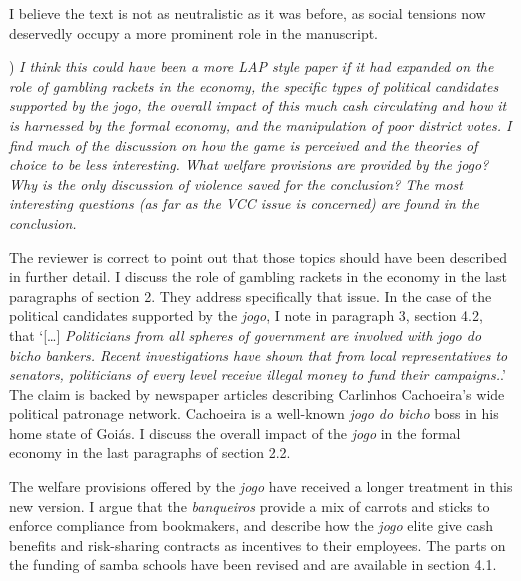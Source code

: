 \documentclass[a4paper,12pt]{article}
\begin{document}
I believe the text is not as neutralistic as it was before, as social tensions now deservedly occupy a more prominent role in the manuscript.

\vspace{.5cm}

) \textit{I think this could have been a more LAP style paper if it had expanded on the role of gambling rackets in the economy, the specific types of political candidates supported by the jogo, the overall impact of this much cash circulating and how it is harnessed by the formal economy, and the manipulation of poor district votes. I find much of the discussion on how the game is perceived and the theories of choice to be less interesting. What welfare provisions are provided by the jogo? Why is the only discussion of violence saved for the conclusion? The most interesting questions (as far as the VCC issue is concerned) are found in the conclusion.}

\vspace{.25cm}

The reviewer is correct to point out that those topics should have been described in further detail. I discuss the role of gambling rackets in the economy in the last paragraphs of section 2. They address specifically that issue. In the case of the political candidates supported by the \textit{jogo}, I note in paragraph 3, section 4.2, that `[\dots] \textit{Politicians from all spheres of government are involved with jogo do bicho bankers. Recent investigations have shown that from local representatives to senators, politicians of every level receive illegal money to fund their campaigns.}.' The claim is backed by newspaper articles describing Carlinhos Cachoeira's wide political patronage network. Cachoeira is a well-known \textit{jogo do bicho} boss in his home state of Goiás. I discuss the overall impact of the \textit{jogo} in the formal economy in the last paragraphs of section 2.2.  

The welfare provisions offered by the \textit{jogo} have received a longer treatment in this new version. I argue that the \textit{banqueiros} provide a mix of carrots and sticks to enforce compliance from bookmakers, and describe how the \textit{jogo} elite give cash benefits and risk-sharing contracts as incentives to their employees. The parts on the funding of samba schools have been revised and are available in section 4.1.    

\vspace{.5cm}
\end{document}
